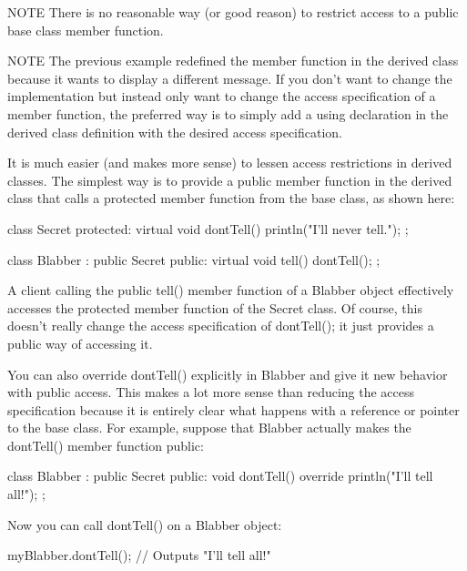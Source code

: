\begin{myNotic}{NOTE}
There is no reasonable way (or good reason) to restrict access to a public base class member function.
\end{myNotic}

\begin{myNotic}{NOTE}
The previous example redefined the member function in the derived class because it wants to display a different message. If you don’t want to change the implementation but instead only want to change the access specification of a member function, the preferred way is to simply add a using declaration in the derived class definition with the desired access specification.
\end{myNotic}

It is much easier (and makes more sense) to lessen access restrictions in derived classes. The simplest way is to provide a public member function in the derived class that calls a protected member function from the base class, as shown here:

\begin{cpp}
class Secret
{
    protected:
        virtual void dontTell() { println("I'll never tell."); }
};

class Blabber : public Secret
{
    public:
        virtual void tell() { dontTell(); }
};
\end{cpp}

A client calling the public tell() member function of a Blabber object effectively accesses the protected member function of the Secret class. Of course, this doesn’t really change the access specification of dontTell(); it just provides a public way of accessing it.

You can also override dontTell() explicitly in Blabber and give it new behavior with public access. This makes a lot more sense than reducing the access specification because it is entirely clear what happens with a reference or pointer to the base class. For example, suppose that Blabber actually makes the dontTell() member function public:

\begin{cpp}
class Blabber : public Secret
{
    public:
        void dontTell() override { println("I'll tell all!"); }
};
\end{cpp}

Now you can call dontTell() on a Blabber object:

\begin{cpp}
myBlabber.dontTell(); // Outputs "I'll tell all!"
\end{cpp}

